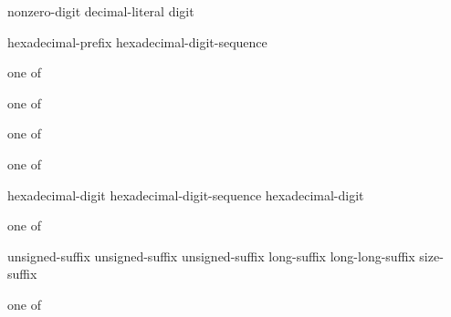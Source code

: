 \begin{bnf}
\br
    nonzero-digit\br
    decimal-literal  digit
\end{bnf}

\begin{bnf}
\br
    hexadecimal-prefix hexadecimal-digit-sequence
\end{bnf}

\begin{bnf}
 \textnormal{one of}\br
\end{bnf}

\begin{bnf}
 \textnormal{one of}\br
\end{bnf}

\begin{bnf}
 \textnormal{one of}\br
\end{bnf}

\begin{bnf}
 \textnormal{one of}\br
\end{bnf}

\begin{bnf}
\br
    hexadecimal-digit\br
    hexadecimal-digit-sequence  hexadecimal-digit
\end{bnf}

\begin{bnf}
 \textnormal{one of}\br
    \br
    \br
\end{bnf}

\begin{bnf}
\br
    unsigned-suffix  \br
    unsigned-suffix  \br
    unsigned-suffix  \br
    long-suffix  \br
    long-long-suffix  \br
    size-suffix 
\end{bnf}

\begin{bnf}
 \textnormal{one of}\br
\end{bnf}

